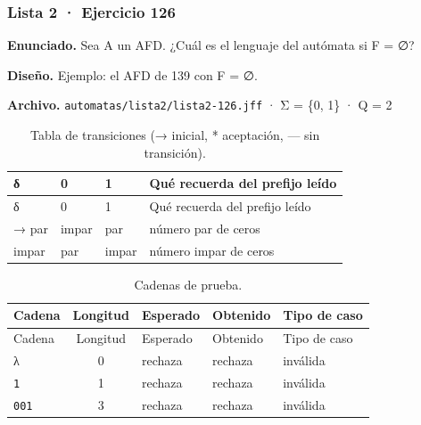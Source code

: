 
\hypertarget{lista-2-ejercicio-126}{%
\subsubsection{Lista 2 · Ejercicio 126}\label{lista-2-ejercicio-126}}

\textbf{Enunciado.} Sea A un AFD. ¿Cuál es el lenguaje del autómata si F = ∅?

\textbf{Diseño.} Ejemplo: el AFD de 139 con F = ∅.

\textbf{Archivo.} \texttt{automatas/lista2/lista2-126.jff} · Σ = \{0, 1\} · \textbar Q\textbar{} = 2

\begin{longtable}[]{@{}llll@{}}
\caption{Tabla de transiciones (→ inicial, * aceptación, --- sin transición).}\tabularnewline
\toprule\noalign{}
δ & 0 & 1 & Qué recuerda del prefijo leído \\
\midrule\noalign{}
\endfirsthead
\toprule\noalign{}
δ & 0 & 1 & Qué recuerda del prefijo leído \\
\midrule\noalign{}
\endhead
\bottomrule\noalign{}
\endlastfoot
→ par & impar & par & número par de ceros \\
impar & par & impar & número impar de ceros \\
\end{longtable}

\begin{longtable}[]{@{}lclll@{}}
\caption{Cadenas de prueba.}\tabularnewline
\toprule\noalign{}
Cadena & Longitud & Esperado & Obtenido & Tipo de caso \\
\midrule\noalign{}
\endfirsthead
\toprule\noalign{}
Cadena & Longitud & Esperado & Obtenido & Tipo de caso \\
\midrule\noalign{}
\endhead
\bottomrule\noalign{}
\endlastfoot
λ & 0 & rechaza & rechaza & inválida \\
\texttt{1} & 1 & rechaza & rechaza & inválida \\
\texttt{001} & 3 & rechaza & rechaza & inválida \\
\end{longtable}


